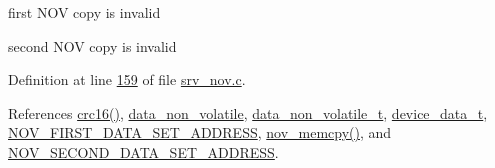 first N\+O\+V copy is invalid

second N\+O\+V copy is invalid 

Definition at line \hyperlink{a00060_source_l00159}{159} of file \hyperlink{a00060_source}{srv\+\_\+nov.\+c}.



References \hyperlink{a00060_source_l00084}{crc16()}, \hyperlink{a00060_source_l00016}{data\+\_\+non\+\_\+volatile}, \hyperlink{a00022_source_l00327}{data\+\_\+non\+\_\+volatile\+\_\+t}, \hyperlink{a00022_source_l00307}{device\+\_\+data\+\_\+t}, \hyperlink{a00029_source_l00033}{N\+O\+V\+\_\+\+F\+I\+R\+S\+T\+\_\+\+D\+A\+T\+A\+\_\+\+S\+E\+T\+\_\+\+A\+D\+D\+R\+E\+S\+S}, \hyperlink{a00060_source_l00723}{nov\+\_\+memcpy()}, and \hyperlink{a00029_source_l00035}{N\+O\+V\+\_\+\+S\+E\+C\+O\+N\+D\+\_\+\+D\+A\+T\+A\+\_\+\+S\+E\+T\+\_\+\+A\+D\+D\+R\+E\+S\+S}.


